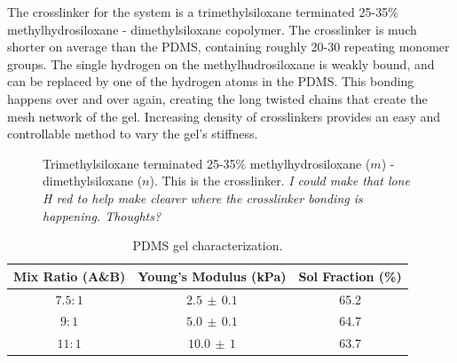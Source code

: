 The crosslinker for the system is a trimethylsiloxane terminated 25-35\% methylhydrosiloxane - dimethylsiloxane copolymer. The crosslinker is much shorter on average than the PDMS, containing roughly 20-30 repeating monomer groups. The single hydrogen on the methylhudrosiloxane is weakly bound, and can be replaced by one of the hydrogen atoms in the PDMS. This bonding happens over and over again, creating the long twisted chains that create the mesh network of the gel. Increasing density of crosslinkers provides an easy and controllable method to vary the gel's stiffness.

\begin{figure}
	\centering
	\label{fig:HMS-301}
	\caption[HMS-301]{Trimethylsiloxane terminated 25-35\% methylhydrosiloxane ($m$) - dimethylsiloxane ($n$). This is the crosslinker. \emph{I could make that lone H red to help make clearer where the crosslinker bonding is happening. Thoughts?}}
\end{figure}

\begin{table}[h!]
	\caption[PDMS ratios Characterization]{PDMS gel characterization.}
	\begin{center}
		\begin{tabular}{|c||c||c|}
			\hline
			Mix Ratio (A\&B) & Young's Modulus (kPa) & Sol Fraction (\%)\\
			\hline
			$7.5:1$ & $2.5 \,\pm\, 0.1$ & 65.2\\
			\hline
			$9:1$ & $5.0 \, \pm\, 0.1$  & 64.7\\
			\hline
			$11:1$ & $10.0 \,\pm\, 1$  & 63.7\\
			\hline
		\end{tabular}
	\end{center}
	\label{tab:recipes}
\end{table}



